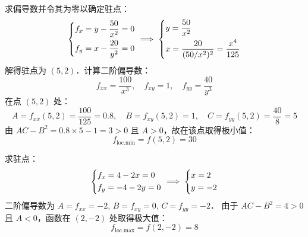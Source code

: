 \begin{solution}
    求偏导数并令其为零以确定驻点：
    \begin{equation}
        \begin{dcases}
            f_x = y - \dfrac{50}{x^2} = 0 \\
            f_y = x - \dfrac{20}{y^2} = 0
        \end{dcases} \implies
        \begin{dcases}
            y = \dfrac{50}{x^2} \\
            x = \dfrac{20}{(50/x^2)^2} = \dfrac{x^4}{125}
        \end{dcases}
    \end{equation}
    解得驻点为 $(5, 2)$．计算二阶偏导数：
    \begin{equation}
        f_{xx} = \frac{100}{x^3}, \quad f_{xy} = 1, \quad f_{yy} = \frac{40}{y^3}
    \end{equation}
    在点 $(5, 2)$ 处：
    \begin{equation}
        A = f_{xx}(5, 2) = \frac{100}{125} = 0.8, \quad B = f_{xy}(5, 2) = 1, \quad C = f_{yy}(5, 2) = \frac{40}{8} = 5
    \end{equation}
    由 $AC - B^2 = 0.8 \times 5 - 1 = 3 > 0$ 且 $A > 0$，故在该点取得极小值：
    \begin{equation}
        \boxed{f_{\text{loc.min}} = f(5, 2) = 30}
    \end{equation}

    求驻点：
    \begin{equation}
        \begin{dcases}
            f_x = 4 - 2x = 0 \\
            f_y = -4 - 2y = 0
        \end{dcases} \implies
        \begin{dcases}
            x = 2 \\
            y = -2
        \end{dcases}
    \end{equation}
    二阶偏导数为 $A = f_{xx} = -2$, $B = f_{xy} = 0$, $C = f_{yy} = -2$．
    由于 $AC - B^2 = 4 > 0$ 且 $A < 0$，函数在 $(2, -2)$ 处取得极大值：
    \begin{equation}
        \boxed{f_{\text{loc.max}} = f(2, -2) = 8}
    \end{equation}


\end{solution}
